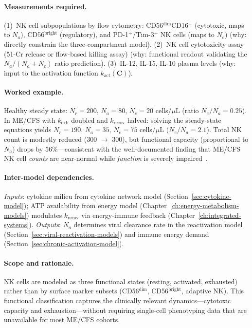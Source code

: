 \paragraph{Measurements required.}
(1)~NK cell subpopulations by flow cytometry: CD56$^{\text{dim}}$CD16$^+$ (cytotoxic, maps to $N_a$), CD56$^{\text{bright}}$ (regulatory), and PD-1$^+$/Tim-3$^+$ NK cells (maps to $N_e$) (why: directly constrain the three-compartment model).
(2)~NK cell cytotoxicity assay (51-Cr release or flow-based killing assay) (why: functional readout validating the $N_a/(N_a + N_e)$ ratio prediction).
(3)~IL-12, IL-15, IL-10 plasma levels (why: input to the activation function $k_{\text{act}}(\boldsymbol{C})$).

\paragraph{Worked example.}
Healthy steady state: $N_r = 200$, $N_a = 80$, $N_e = 20$ cells/$\mu$L (ratio $N_e/N_a = 0.25$). In ME/CFS with $k_{\text{exh}}$ doubled and $k_{\text{recov}}$ halved: solving the steady-state equations yields $N_r = 190$, $N_a = 35$, $N_e = 75$ cells/$\mu$L ($N_e/N_a = 2.1$). Total NK count is modestly reduced (300 $\to$ 300), but functional capacity (proportional to $N_a$) drops by 56\%---consistent with the well-documented finding that ME/CFS NK cell \emph{counts} are near-normal while \emph{function} is severely impaired~\cite{Hardcastle2016}.

\paragraph{Inter-model dependencies.}
\emph{Inputs}: cytokine milieu from cytokine network model (Section~\ref{sec:cytokine-model}); ATP availability from energy model (Chapter~\ref{ch:energy-metabolism-models}) modulates $k_{\text{recov}}$ via energy-immune feedback (Chapter~\ref{ch:integrated-systems}). \emph{Outputs}: $N_a$ determines viral clearance rate in the reactivation model (Section~\ref{sec:viral-reactivation-models}) and immune energy demand (Section~\ref{sec:chronic-activation-model}).

\paragraph{Scope and rationale.}
NK cells are modeled as three functional states (resting, activated, exhausted) rather than by surface marker subsets (CD56$^{\text{dim}}$, CD56$^{\text{bright}}$, adaptive NK). This functional classification captures the clinically relevant dynamics---cytotoxic capacity and exhaustion---without requiring single-cell phenotyping data that are unavailable for most ME/CFS cohorts.

